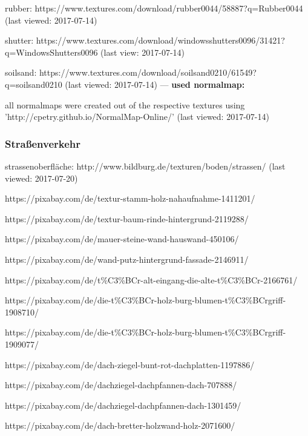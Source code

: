 \documentclass{Paper}
\begin{document}
\begin{appendix}
rubber:
https://www.textures.com/download/rubber0044/58887?q=Rubber0044
(last viewed: 2017-07-14)

shutter:
https://www.textures.com/download/windowsshutters0096/31421?q=WindowsShutters0096
(last view: 2017-07-14)

soilsand:
https://www.textures.com/download/soilsand0210/61549?q=soilsand0210
(last viewed: 2017-07-14)
---
\textbf{used normalmap:}

all normalmaps were created out of the respective textures using 'http://cpetry.github.io/NormalMap-Online/'
(last viewed: 2017-07-14)

\subsubsection{Straßenverkehr}

strassenoberfläche:
http://www.bildburg.de/texturen/boden/strassen/
(last viewed: 2017-07-20)


https://pixabay.com/de/textur-stamm-holz-nahaufnahme-1411201/



https://pixabay.com/de/textur-baum-rinde-hintergrund-2119288/



https://pixabay.com/de/mauer-steine-wand-hauswand-450106/



https://pixabay.com/de/wand-putz-hintergrund-fassade-2146911/



https://pixabay.com/de/t\%C3\%BCr-alt-eingang-die-alte-t\%C3\%BCr-2166761/



https://pixabay.com/de/die-t\%C3\%BCr-holz-burg-blumen-t\%C3\%BCrgriff-1908710/



https://pixabay.com/de/die-t\%C3\%BCr-holz-burg-blumen-t\%C3\%BCrgriff-1909077/



https://pixabay.com/de/dach-ziegel-bunt-rot-dachplatten-1197886/



https://pixabay.com/de/dachziegel-dachpfannen-dach-707888/



https://pixabay.com/de/dachziegel-dachpfannen-dach-1301459/



https://pixabay.com/de/dach-bretter-holzwand-holz-2071600/




\end{appendix}
\end{document}
